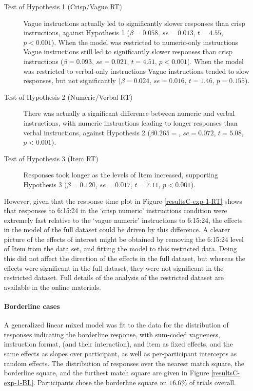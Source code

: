 \begin{description}
	\item [Test of Hypothesis 1 (Crisp/Vague RT)] Vague instructions actually led to significantly slower responses than crisp instructions, against Hypothesis 1 ($\beta=0.058$, $se=0.013$, $t=4.55$, $p<0.001$). When the model was restricted to numeric-only instructions Vague instructions still led to significantly slower responses than crisp instructions ($\beta=0.093$, $se=0.021$, $t=4.51$, $p<0.001$). When the model was restricted to verbal-only instructions Vague instructions tended to slow responses, but not significantly ($\beta=0.024$, $se=0.016$, $t=1.46$, $p=0.155$).
	\item [Test of Hypothesis 2 (Numeric/Verbal RT)] There was actually a significant difference between numeric and verbal instructions, with numeric instructions leading to longer responses than verbal instructions, against Hypothesis 2 ($\beta0.265=$, $se=0.072$, $t=5.08$, $p<0.001$).
	\item [Test of Hypothesis 3 (Item RT)] Responses took longer as the levels of Item increased, supporting Hypothesis 3 ($\beta=0.120$, $se=0.017$, $t=7.11$, $p<0.001$).
\end{description}

However, given that the response time plot in Figure \ref{resultsC-exp-1-RT} shows that responses to 6:15:24 in the `crisp numeric' instructions condition were extremely fast relative to the `vague numeric' instructions to 6:15:24, the effects in the model of the full dataset could be driven by this difference. A clearer picture of the effects of interest might be obtained by removing the 6:15:24 level of Item from the data set, and fitting the model to this restricted data. Doing this did not affect the direction of the effects in the full dataset, but whereas the effects were significant in the full dataset, they were not significant in the restricted dataset. Full details of the analysis of the restricted dataset are available in the online materials.

\paragraph{\textbf{Borderline cases}}

A generalized linear mixed model \citet{jaeger2008categorical} was fit to the data for the distribution of responses indicating the borderline response, with sum-coded vagueness, instruction format, (and their interaction), and item as fixed effects, and the same effects as slopes over participant, as well as per-participant intercepts as random effects. The distribution of responses over the nearest match square, the borderline square, and the furthest match square are given in Figure \ref{resultsC-exp-1-BL}. Participants chose the borderline square on $16.6\%$ of trials overall.

